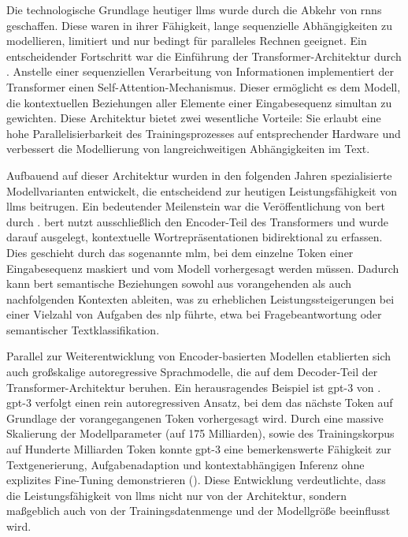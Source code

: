 Die technologische Grundlage heutiger \glspl{llm} wurde durch die Abkehr von \glspl{rnn} geschaffen.
Diese waren in ihrer Fähigkeit, lange sequenzielle Abhängigkeiten zu modellieren, limitiert und nur bedingt für paralleles Rechnen geeignet\autocite{vaswani_attention_2023}.
Ein entscheidender Fortschritt war die Einführung der Transformer-Architektur durch \citeauthor{vaswani_attention_2023}.
Anstelle einer sequenziellen Verarbeitung von Informationen implementiert der Transformer einen Self-Attention-Mechanismus.
Dieser ermöglicht es dem Modell, die kontextuellen Beziehungen aller Elemente einer Eingabesequenz simultan zu gewichten.
Diese Architektur bietet zwei wesentliche Vorteile: Sie erlaubt eine hohe Parallelisierbarkeit des Trainingsprozesses auf entsprechender Hardware und verbessert die Modellierung von langreichweitigen Abhängigkeiten im Text\autocite{vaswani_attention_2023}.

Aufbauend auf dieser Architektur wurden in den folgenden Jahren spezialisierte Modellvarianten entwickelt, die entscheidend zur heutigen Leistungsfähigkeit von \glspl{llm} beitrugen.
Ein bedeutender Meilenstein war die Veröffentlichung von \gls{bert} durch \citeauthor{devlin_bert_2019}\autocite{devlin_bert_2019}.
\gls{bert} nutzt ausschließlich den Encoder-Teil des Transformers und wurde darauf ausgelegt, kontextuelle Wortrepräsentationen bidirektional zu erfassen.
Dies geschieht durch das sogenannte \gls{mlm}, bei dem einzelne Token einer Eingabesequenz maskiert und vom Modell vorhergesagt werden müssen.
Dadurch kann \gls{bert} semantische Beziehungen sowohl aus vorangehenden als auch nachfolgenden Kontexten ableiten, was zu erheblichen Leistungssteigerungen bei einer Vielzahl von Aufgaben des \gls{nlp} führte, etwa bei Fragebeantwortung oder semantischer Textklassifikation\autocite{devlin_bert_2019}.

Parallel zur Weiterentwicklung von Encoder-basierten Modellen etablierten sich auch großskalige autoregressive Sprachmodelle, die auf dem Decoder-Teil der Transformer-Architektur beruhen.
Ein herausragendes Beispiel ist \gls{gpt}-3 von \citeauthor{brown_language_2020}\autocite{brown_language_2020}.
\gls{gpt}-3 verfolgt einen rein autoregressiven Ansatz, bei dem das nächste Token auf Grundlage der vorangegangenen Token vorhergesagt wird.
Durch eine massive Skalierung der Modellparameter (auf 175 Milliarden), sowie des Trainingskorpus auf Hunderte Milliarden Token konnte \gls{gpt}-3 eine bemerkenswerte Fähigkeit zur Textgenerierung, Aufgabenadaption und kontextabhängigen Inferenz ohne explizites Fine-Tuning demonstrieren ().
Diese Entwicklung verdeutlichte, dass die Leistungsfähigkeit von \glspl{llm} nicht nur von der Architektur, sondern maßgeblich auch von der Trainingsdatenmenge und der Modellgröße beeinflusst wird.

